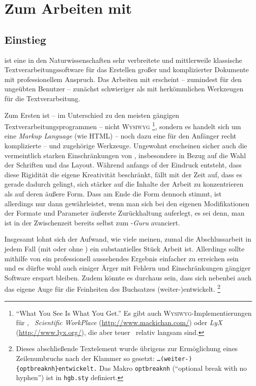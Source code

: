\chapter{Zum Arbeiten mit \latex}
\label{cha:ArbeitenMitLatex}

\section{Einstieg}
\label{sec:LatexEinstieg}

\latex ist eine in den Naturwissenschaften sehr verbreitete
und mittlerweile klassische Textverarbeitungssoftware für das Erstellen
großer und komplizierter Dokumente mit professionellem Anspruch.
Das Arbeiten mit \latex erscheint -- zumindest für den ungeübten Benutzer -- %
zunächst schwieriger als mit herkömmlichen Werkzeugen für die
Textverarbeitung.

Zum Ersten ist -- im Unterschied zu den meisten gängigen
Text\-ver\-arbei\-tungs\-prog\-ram\-men -- \latex nicht \textsc{Wysiwyg}%
\footnote{"`What You See Is What You Get."' Es gibt auch 
\textsc{Wysiwyg}-Implementierungen für \latex, 
\zB\ \emph{Scientific WorkPlace} (\url{http://www.mackichan.com/}) oder
\emph{LyX} (\url{http://www.lyx.org/}), 
die aber teuer \bzw\ relativ langsam sind.},
sondern es handelt sich um eine \emph{Markup Lang\-uage} (wie HTML) -- noch dazu
eine für den Anfänger recht komplizierte -- und zugehörige Werkzeuge.
Ungewohnt erscheinen sicher auch die vermeintlich starken
Einschränkungen von \latex,
insbesondere in Bezug auf die Wahl der Schriften und das
Layout. Während anfangs of der Eindruck entsteht, dass diese Rigidität
die eigene Kreativität beschränkt, fällt mit der Zeit auf, dass es gerade
dadurch gelingt, sich stärker auf die Inhalte der Arbeit zu
konzentrieren als auf deren äußere Form. Dass am Ende die Form dennoch stimmt,
ist allerdings nur dann gewährleistet, wenn man sich bei den eigenen Modifikationen
der Formate und Parameter äußerste Zurückhaltung auferlegt, es sei denn,
man ist in der Zwischenzeit bereits selbst zum \latex-\emph{Guru} avanciert.

Insgesamt lohnt sich der Aufwand, wie viele meinen, zumal die Abschlussarbeit
in jedem Fall (mit oder ohne \latex) ein substantielles Stück Arbeit ist.
Allerdings sollte mithilfe von \latex ein professionell aussehendes
Ergebnis einfacher zu erreichen sein und es dürfte wohl auch einiger
Ärger mit Fehlern und Einschränkungen gängiger Software erspart bleiben.
Zudem könnte es durchaus sein, dass sich nebenbei auch das eigene Auge für
die Feinheiten des Buchsatzes (weiter-){\obnh}entwickelt.%
\footnote{Dieses abschließende Textelement wurde übrigens zur Ermöglichung eines 
Zeilenumbruchs nach der Klammer so gesetzt: \texttt{\ldots (weiter-)\{{\bs}optbreaknh\}entwickelt.}
Das Makro \texttt{{\bs}optbreaknh} ("`optional break with no hyphen"') ist in 
\texttt{hgb.sty} definiert.}


